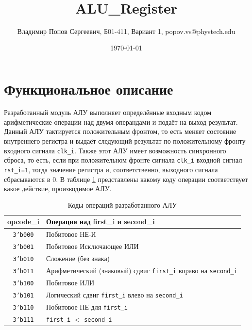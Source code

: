 \documentclass[12pt]{extarticle}
\title{ALU\_Register}
\author{Владимир Попов Сергеевич, Б01-411, Вариант 1, popov.vs@phystech.edu}
\date{\today}
\begin{document}
\maketitle

\newpage

\tableofcontents

\newpage

\section{Функциональное описание}

Разработанный модуль АЛУ выполняет определённые входным кодом арифметические операции над двумя операндами и подаёт на выход результат. Данный АЛУ тактируется положительным фронтом, то есть меняет состояние внутреннего регистра и выдаёт следующий результат по положительному фронту входного сигнала \texttt{clk\_i}. Также этот АЛУ имеет возможность синхронного сброса, то есть, если при положительном фронте сигнала \texttt{clk\_i} входной сигнал \texttt{rst\_i=1}, тогда значение регистра и, соответственно, выходного сигнала сбрасываются в 0. В таблице \ref{tab:opcodes} представлены какому коду операции соответствует какое действие, производимое АЛУ.

\begin{table}[h!]
    \centering
    \caption{Коды операций разработанного АЛУ}
    \label{tab:opcodes}
    \begin{tabular}{|c|l|}
        \hline
        \textbf{opcode\_i}  & \textbf{Операция над first\_i и second\_i} \\ \hline
        \texttt{3'b000}     & Побитовое НЕ-И \\ \hline
        \texttt{3'b001}     & Побитовое Исключающее ИЛИ \\ \hline
        \texttt{3'b010}     & Сложение (без знака) \\ \hline
        \texttt{3'b011}     & Арифметический (знаковый) сдвиг \texttt{first\_i} вправо на \texttt{second\_i} \\ \hline
        \texttt{3'b100}     & Побитовое ИЛИ \\ \hline
        \texttt{3'b101}     & Логический сдвиг \texttt{first\_i} влево на \texttt{second\_i} \\ \hline
        \texttt{3'b110}     & Побитовое НЕ для \texttt{first\_i} \\ \hline
        \texttt{3'b111}     & \texttt{first\_i} $<$ \texttt{second\_i} \\ \hline
    \end{tabular}
\end{table}
\end{document}
